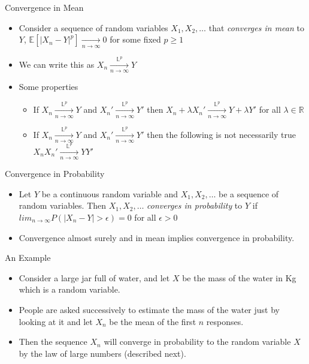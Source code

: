 \documentclass{beamer}
\begin{document}
\begin{frame}{Convergence in Mean} 
\begin{itemize}
 \item Consider a sequence of random variables $X_1, X_2, \ldots$ that \emph{converges in mean} to $Y$, $\mathbb{E}[|X_n - Y|^p] \xrightarrow[n \rightarrow \infty]{} 0$ for some fixed $p \geq 1$
 \item We can write this as $X_n \xrightarrow[n \rightarrow \infty]{\mathbb{L}^p} Y$ 
 \item Some properties 
 \begin{itemize} 
  \item If $X_n \xrightarrow[n \rightarrow \infty]{\mathbb{L}^p} Y$ and $X_n' \xrightarrow[n \rightarrow \infty]{\mathbb{L}^p} Y'$ then $X_n + \lambda X_n' \xrightarrow[n \rightarrow \infty]{\mathbb{L}^p} Y + \lambda Y'$ for all $\lambda \in \mathbb{R}$
  \item  If $X_n \xrightarrow[n \rightarrow \infty]{\mathbb{L}^p} Y$ and $X_n' \xrightarrow[n \rightarrow \infty]{\mathbb{L}^p} Y'$  then the following is not necessarily true $X_nX_n' \xrightarrow[n \rightarrow \infty]{\mathbb{L}^p} Y Y'$
 \end{itemize}
\end{itemize} 
\end{frame}

\begin{frame}{Convergence in Probability}  
\begin{itemize} 
 \item Let $Y$ be a continuous random variable and $X_1, X_2, \ldots$ be a sequence of random variables. Then $X_1, X_2, \ldots$ \emph{converges in probability} to $Y$ if $lim_{n \rightarrow \infty} P(|X_n - Y| > \epsilon) = 0$ for all $\epsilon > 0$ 
 \item Convergence almost surely and in mean implies convergence in probability. 
\end{itemize}
\end{frame}

\begin{frame}{An Example} 
\begin{itemize}
 \item Consider a large jar full of water, and let $X$ be the mass of the water in Kg which is a random variable. 
 \item People are asked successively to estimate the mass of the water just by looking at it and let $X_n$ be the mean of the first $n$ responses. 
 \item Then the sequence $X_n$ will converge in probability to the random variable $X$ by the law of large numbers (described next). 
\end{itemize}
\end{frame}
\end{document}
